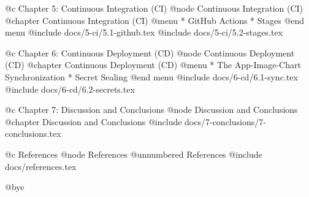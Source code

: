 @c Chapter 5: Continuous Integration (CI)
@node Continuous Integration (CI)
@chapter Continuous Integration (CI)
@menu
* GitHub Actions
* Stages
@end menu
@include docs/5-ci/5.1-github.tex
@include docs/5-ci/5.2-stages.tex

@c Chapter 6: Continuous Deployment (CD)
@node Continuous Deployment (CD)
@chapter Continuous Deployment (CD)
@menu
* The App-Image-Chart Synchronization
* Secret Sealing
@end menu
@include docs/6-cd/6.1-sync.tex
@include docs/6-cd/6.2-secrets.tex

@c Chapter 7: Discussion and Conclusions
@node Discussion and Conclusions
@chapter Discussion and Conclusions
@include docs/7-conclusions/7-conclusions.tex


@c References
@node References
@unnumbered References
@include docs/references.tex


@bye
